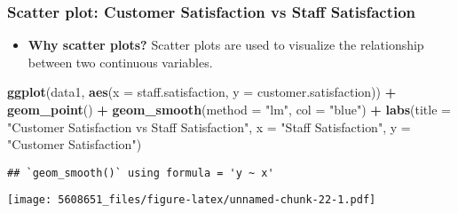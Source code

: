 \documentclass[
]{article}
\newenvironment{Shaded}{\begin{snugshade}}{\end{snugshade}}
\newcommand{\AttributeTok}[1]{\textcolor[rgb]{0.13,0.29,0.53}{#1}}
\newcommand{\FunctionTok}[1]{\textcolor[rgb]{0.13,0.29,0.53}{\textbf{#1}}}
\newcommand{\NormalTok}[1]{#1}
\newcommand{\SpecialCharTok}[1]{\textcolor[rgb]{0.81,0.36,0.00}{\textbf{#1}}}
\newcommand{\StringTok}[1]{\textcolor[rgb]{0.31,0.60,0.02}{#1}}
\providecommand{\tightlist}{%
  \setlength{\itemsep}{0pt}\setlength{\parskip}{0pt}}
\begin{document}
\subsubsection{Scatter plot: Customer Satisfaction vs Staff
Satisfaction}\label{scatter-plot-customer-satisfaction-vs-staff-satisfaction}

\begin{itemize}
\tightlist
\item
  \textbf{Why scatter plots?} Scatter plots are used to visualize the
  relationship between two continuous variables.
\end{itemize}

\begin{Shaded}
\begin{Highlighting}[]
\FunctionTok{ggplot}\NormalTok{(data1, }\FunctionTok{aes}\NormalTok{(}\AttributeTok{x =}\NormalTok{ staff.satisfaction, }\AttributeTok{y =}\NormalTok{ customer.satisfaction)) }\SpecialCharTok{+}
  \FunctionTok{geom\_point}\NormalTok{() }\SpecialCharTok{+}
  \FunctionTok{geom\_smooth}\NormalTok{(}\AttributeTok{method =} \StringTok{"lm"}\NormalTok{, }\AttributeTok{col =} \StringTok{"blue"}\NormalTok{) }\SpecialCharTok{+}
  \FunctionTok{labs}\NormalTok{(}\AttributeTok{title =} \StringTok{"Customer Satisfaction vs Staff Satisfaction"}\NormalTok{,}
       \AttributeTok{x =} \StringTok{"Staff Satisfaction"}\NormalTok{,}
       \AttributeTok{y =} \StringTok{"Customer Satisfaction"}\NormalTok{)}
\end{Highlighting}
\end{Shaded}

\begin{verbatim}
## `geom_smooth()` using formula = 'y ~ x'
\end{verbatim}

\texttt{[image: 5608651\_files/figure-latex/unnamed-chunk-22-1.pdf]}
\end{document}
